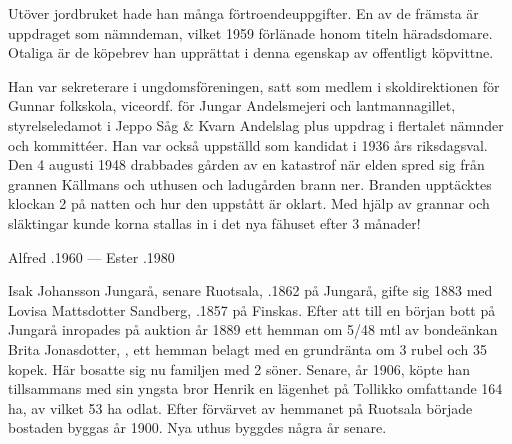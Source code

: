 Utöver jordbruket hade han många förtroendeuppgifter. En av de främsta är uppdraget som nämndeman, vilket 1959 förlänade honom titeln häradsdomare. Otaliga är de köpebrev han upprättat i denna egenskap av offentligt köpvittne.

Han var sekreterare i ungdomsföreningen, satt som medlem i skoldirektionen för Gunnar folkskola, viceordf. för Jungar Andelsmejeri och lantmannagillet, styrelseledamot i Jeppo Såg \& Kvarn Andelslag plus uppdrag i flertalet nämnder och kommittéer. Han var också uppställd som kandidat i 1936 års riksdagsval. Den 4 augusti 1948 drabbades gården av en katastrof när elden spred sig från grannen Källmans och uthusen och ladugården brann ner. Branden upptäcktes klockan 2 på natten och hur den uppstått är oklart. Med hjälp av grannar och släktingar kunde korna stallas in i det nya fähuset efter 3 månader!
\begin{jhchildren}
  \item {}
  \item {}
  \item {}
  \item {}
  \item {}
  \item {}
  \item {}
\end{jhchildren}

Alfred .1960  ---  Ester .1980


Isak Johansson Jungarå, senare Ruotsala, .1862 på Jungarå, gifte sig 1883 med Lovisa Mattsdotter Sandberg, .1857 på Finskas. Efter att till en början bott på Jungarå inropades på auktion år 1889 ett hemman om 5/48 mtl av bondeänkan Brita Jonasdotter, , ett hemman belagt med en grundränta om 3 rubel och 35 kopek. Här bosatte sig nu familjen med 2 söner. Senare, år 1906, köpte han tillsammans med sin yngsta bror Henrik en lägenhet på Tollikko omfattande 164 ha, av vilket 53 ha odlat. Efter förvärvet av hemmanet på Ruotsala började bostaden byggas år 1900. Nya uthus byggdes några år senare.

